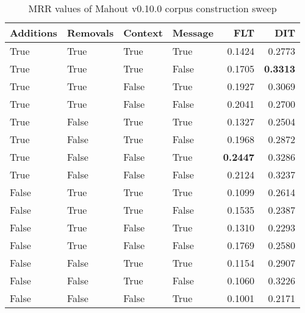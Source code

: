 
\begin{table}
\begin{spacing}{1.2}
\centering
\caption{MRR values of Mahout v0.10.0 corpus construction sweep}
\label{table:mahout_corpus_sweep}
\vspace{0.2em}
\begin{tabular}{llll|rr}
\toprule
Additions & Removals & Context & Message & FLT &       DIT \\
\midrule
     True &     True &    True &    True &           0.1424 &       0.2773 \\
     True &     True &    True &   False &           0.1705 & {\bf 0.3313} \\
     True &     True &   False &    True &           0.1927 &       0.3069 \\
     True &     True &   False &   False &           0.2041 &       0.2700 \\
     True &    False &    True &    True &           0.1327 &       0.2504 \\
     True &    False &    True &   False &           0.1968 &       0.2872 \\
     True &    False &   False &    True &     {\bf 0.2447} &       0.3286 \\
     True &    False &   False &   False &           0.2124 &       0.3237 \\
    False &     True &    True &    True &           0.1099 &       0.2614 \\
    False &     True &    True &   False &           0.1535 &       0.2387 \\
    False &     True &   False &    True &           0.1310 &       0.2293 \\
    False &     True &   False &   False &           0.1769 &       0.2580 \\
    False &    False &    True &    True &           0.1154 &       0.2907 \\
    False &    False &    True &   False &           0.1060 &       0.3226 \\
    False &    False &   False &    True &           0.1001 &       0.2171 \\
\bottomrule
\end{tabular}

\end{spacing}
\end{table}
